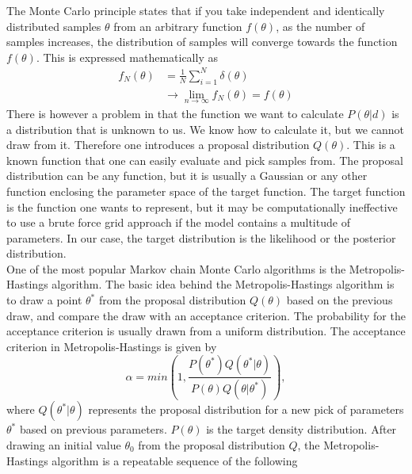 The Monte Carlo principle states that if you take
independent and identically distributed samples $\theta$ from an arbitrary
function $f(\theta)$, as the number of samples increases, the distribution of
samples will converge towards the function $f(\theta)$. This is expressed
mathematically as
\begin{align}
    f_N(\theta) &= \frac{1}{N}\sum_{i=1}^N\delta(\theta)\\
    &\rightarrow \lim_{n\to\infty}f_N(\theta)=f(\theta)
\end{align}
There is however a problem in that the function we want to calculate
$P(\theta\vert d)$ is a distribution that is unknown to us. We
know how to calculate it, but we cannot draw from it. Therefore one introduces a
proposal distribution $Q(\theta)$. This is a known function that one can easily
evaluate and pick samples from. The proposal distribution can be any function,
but it is usually a Gaussian or any other function enclosing the parameter space
of the target function. The target function is the function one wants to
represent, but it may be computationally ineffective to use a brute force grid
approach if the model contains a multitude of parameters. In our case, the
target distribution is the likelihood or the posterior distribution.\\\indent
One of the
most popular Markov chain Monte Carlo algorithms is the Metropolis-Hastings
algorithm. The basic idea behind the Metropolis-Hastings algorithm is to draw a
point $\theta^*$ from the proposal distribution $Q(\theta)$ based on the
previous draw, and compare the draw with an acceptance criterion. The probability for the acceptance criterion is usually drawn
from a uniform distribution. The acceptance criterion in
Metropolis-Hastings is given by
\begin{equation}\label{eq:acceptance}
    \alpha = min(1, \frac{P(\theta^*)Q(\theta^*\vert \theta)}{P(\theta)Q(\theta\vert\theta^*)}),
\end{equation}
where $Q(\theta^*\vert\theta)$ represents the proposal distribution for a new
pick of parameters $\theta^*$ based on previous parameters. $P(\theta)$ is
the target density distribution. After
drawing an initial value $\theta_0$ from the proposal distribution $Q$, the
Metropolis-Hastings algorithm is a repeatable sequence of the following
